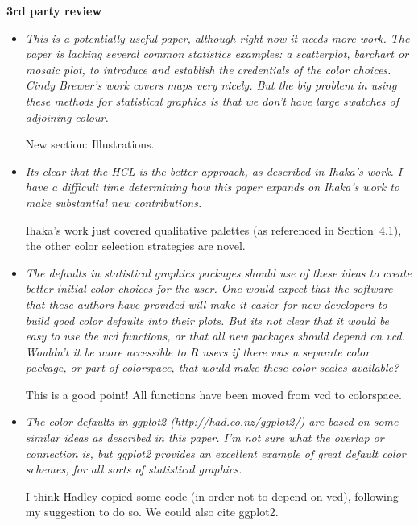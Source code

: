 \documentclass[a4paper]{article}
\begin{document}
\textbf{3rd party review}

\begin{itemize}
  \item \textit{This is a potentially useful paper, although right now it needs more
        work.  The paper is lacking several common statistics examples: a
        scatterplot, barchart or mosaic plot, to introduce and establish the
        credentials of the color choices. Cindy Brewer's work covers maps very
        nicely. But the big problem in using these methods for statistical
        graphics is that we don't have large swatches of adjoining colour.}
	
	New section: Illustrations.
	
  \item \textit{Its clear that the HCL is the better approach, as described in Ihaka's
        work. I have a difficult time determining how this paper expands on
        Ihaka's work to make substantial new contributions.}
	
	Ihaka's work just covered qualitative palettes (as referenced in Section~4.1),
	the other color selection strategies are novel.

  \item \textit{The defaults in statistical graphics packages should use of these
        ideas to create better initial color choices for the user. One would
        expect that the software that these authors have provided will make it
        easier for new developers to build good color defaults into their
        plots. But its not clear that it would be easy to use the vcd
        functions, or that all new packages should depend on vcd. Wouldn't it
        be more accessible to R users if there was a separate color package,
        or part of colorspace, that would make these color scales available?}
	
	This is a good point! All functions have been moved from vcd to colorspace.

  \item \textit{The color defaults in ggplot2 (http://had.co.nz/ggplot2/) are based on
        some similar ideas as described in this paper. I'm not sure what the
        overlap or connection is, but ggplot2 provides an excellent example of
        great default color schemes, for all sorts of statistical graphics.}
	
	I think Hadley copied some code (in order not to depend on vcd), following
	my suggestion to do so. We could also cite ggplot2.

\end{itemize}
\end{document}

